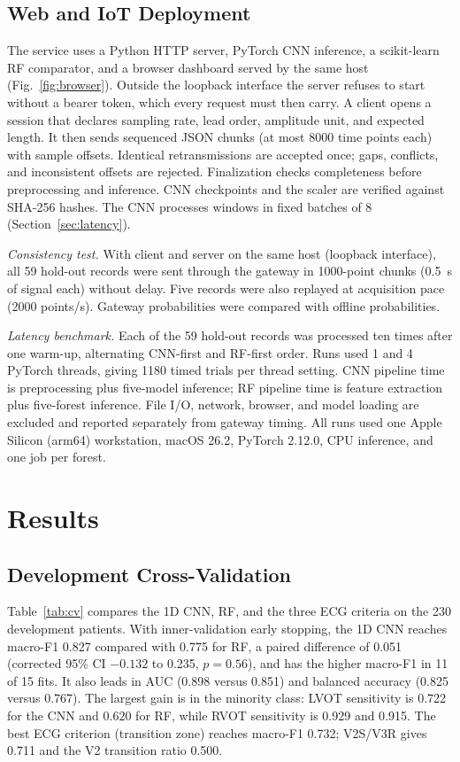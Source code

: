 \documentclass[conference,a4paper]{IEEEtran}
\begin{document}
\subsection{Web and IoT Deployment}
The service uses a Python HTTP server, PyTorch CNN inference, a scikit-learn RF comparator, and a browser dashboard served by the same host (Fig.~\ref{fig:browser}). Outside the loopback interface the server refuses to start without a bearer token, which every request must then carry. A client opens a session that declares sampling rate, lead order, amplitude unit, and expected length. It then sends sequenced JSON chunks (at most 8000 time points each) with sample offsets. Identical retransmissions are accepted once; gaps, conflicts, and inconsistent offsets are rejected. Finalization checks completeness before preprocessing and inference. CNN checkpoints and the scaler are verified against SHA-256 hashes. The CNN processes windows in fixed batches of 8 (Section~\ref{sec:latency}).

\emph{Consistency test.} With client and server on the same host (loopback interface), all 59 hold-out records were sent through the gateway in 1000-point chunks (0.5~s of signal each) without delay. Five records were also replayed at acquisition pace (2000 points/s). Gateway probabilities were compared with offline probabilities.

\emph{Latency benchmark.} Each of the 59 hold-out records was processed ten times after one warm-up, alternating CNN-first and RF-first order. Runs used 1 and 4 PyTorch threads, giving 1180 timed trials per thread setting. CNN pipeline time is preprocessing plus five-model inference; RF pipeline time is feature extraction plus five-forest inference. File I/O, network, browser, and model loading are excluded and reported separately from gateway timing. All runs used one Apple Silicon (arm64) workstation, macOS 26.2, PyTorch 2.12.0, CPU inference, and one job per forest.

\section{Results}
\subsection{Development Cross-Validation}
Table~\ref{tab:cv} compares the 1D CNN, RF, and the three ECG criteria on the 230 development patients. With inner-validation early stopping, the 1D CNN reaches macro-F1 0.827 compared with 0.775 for RF, a paired difference of 0.051 (corrected 95\% CI $-0.132$ to 0.235, $p=0.56$), and has the higher macro-F1 in 11 of 15 fits. It also leads in AUC (0.898 versus 0.851) and balanced accuracy (0.825 versus 0.767). The largest gain is in the minority class: LVOT sensitivity is 0.722 for the CNN and 0.620 for RF, while RVOT sensitivity is 0.929 and 0.915. The best ECG criterion (transition zone) reaches macro-F1 0.732; V2S/V3R gives 0.711 and the V2 transition ratio 0.500.
\end{document}
